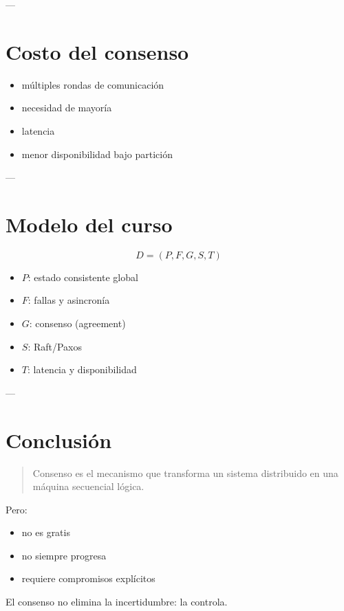 \documentclass[variant=apuntes,cover=institutional,mode=screen]{ua-engineering-v6-article}
\begin{document}
---

\section{Costo del consenso}

\begin{itemize}
\item múltiples rondas de comunicación
\item necesidad de mayoría
\item latencia
\item menor disponibilidad bajo partición
\end{itemize}

---

\section{Modelo del curso}

\[
D = (P, F, G, S, T)
\]

\begin{itemize}
\item $P$: estado consistente global
\item $F$: fallas y asincronía
\item $G$: consenso (agreement)
\item $S$: Raft/Paxos
\item $T$: latencia y disponibilidad
\end{itemize}

---

\section{Conclusión}

\begin{quote}
Consenso es el mecanismo que transforma un sistema distribuido en una máquina secuencial lógica.
\end{quote}

Pero:

\begin{itemize}
\item no es gratis
\item no siempre progresa
\item requiere compromisos explícitos
\end{itemize}

\begin{uakeybox}
El consenso no elimina la incertidumbre: la controla.
\end{uakeybox}
\end{document}
